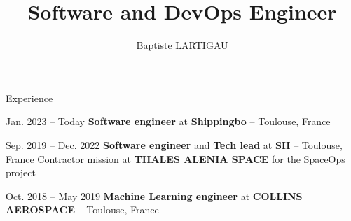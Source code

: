 \documentclass[a4paper, 10pt]{article}
\author{Baptiste LARTIGAU}
\title{Software and DevOps Engineer}
\begin{document}
\thispagestyle{empty}
\maketitle



\section{\faBlackTie}{Experience}

\begin{datedEntry}
    {Jan. 2023 -- Today}
    {\textbf{Software engineer} at \textbf{Shippingbo} -- Toulouse, France}
\end{datedEntry}

\begin{datedEntry}
    {Sep. 2019 -- Dec. 2022}
    {\textbf{Software engineer} and \textbf{Tech lead} at \textbf{SII} -- Toulouse, France}
    Contractor mission at \textbf{THALES ALENIA SPACE} for the SpaceOps project

    \smallskip
\end{datedEntry}

\begin{datedEntry}
    {Oct. 2018 -- May 2019}
    {\textbf{Machine Learning engineer} at \textbf{COLLINS AEROSPACE} -- Toulouse, France}
\end{datedEntry}

\iffalse
\begin{datedEntry}
    {July -- Oct. 2018}
    {\textbf{AWS cloud security engineer} at \textbf{AIRBUS} -- Toulouse, France}
    \entryItem{Applying the \textbf{AWS Well Architected Framework} to Airbus’ infrastructures}
    \entryItem{Defining company-wide security rules and standards for AWS services}
\end{datedEntry}
\fi
\end{document}
